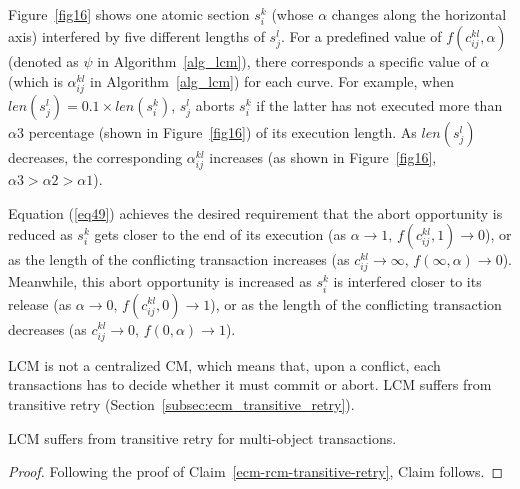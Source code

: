 Figure~\ref{fig16} shows one atomic section $s_i^k$ (whose $\alpha$ changes along the horizontal axis) interfered by five different lengths of $s_j^l$.
For a predefined value of $f(c_{ij}^{kl},\alpha)$ (denoted as $\psi$ in Algorithm~\ref{alg_lcm}), there corresponds a specific value of $\alpha$ (which is $\alpha_{ij}^{kl}$ in Algorithm~\ref{alg_lcm}) for each curve. For example, when $len(s_j^l)=0.1 \times len(s_i^k)$, $s_j^l$ aborts $s_i^k$ if the latter has not executed more than $\alpha3$ percentage (shown in Figure~\ref{fig16}) of its execution length. As $len(s_{j}^{l})$ decreases, the corresponding $\alpha_{ij}^{kl}$ increases (as shown in Figure~\ref{fig16}, $\alpha3>\alpha2>\alpha1$).

Equation (\ref{eq49}) achieves the desired requirement that the abort opportunity is reduced as $s_{i}^{k}$ gets closer to the end of its execution (as $\alpha\rightarrow1,\, f(c_{ij}^{kl},1)\rightarrow0$),
or as the length of the conflicting transaction increases (as $c_{ij}^{kl}\rightarrow\infty,\, f(\infty,\alpha)\rightarrow0$). Meanwhile, this abort opportunity is increased as $s_{i}^{k}$ is interfered closer to its release (as $\alpha\rightarrow0,\, f(c_{ij}^{kl},0)\rightarrow1$),
or as the length of the conflicting transaction decreases (as $c_{ij}^{kl}\rightarrow0,\, f(0,\alpha)\rightarrow1$).

LCM is not a centralized CM, which means that, upon a conflict, each transactions has to decide whether it must commit or abort. LCM suffers from transitive retry (Section~\ref{subsec:ecm_transitive_retry}).
%
\begin{clm}\label{clm:lcm-transitive-retry}
LCM suffers from transitive retry for multi-object transactions.
\end{clm}
%
\begin{proof}\normalfont
%
Following the proof of Claim~\ref{ecm-rcm-transitive-retry}, Claim follows.
%
\end{proof}
%
